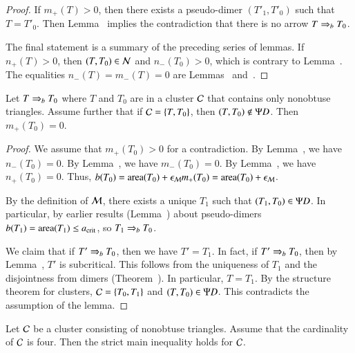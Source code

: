 \begin{proof}
  If $m_+(T)>0$, then there exists a pseudo-dimer $(T'_1,T'_0)$ such
  that $T=T'_0$.  Then Lemma~ implies the
  contradiction that there is no arrow $T\Rightarrow_{b} T_0$.

  The final statement is a summary of the preceding series of lemmas.
   If $n_+(T)>0$, then $(T,T_0)\in\mathcal N$ and $n_-(T_0)>0$, which is contrary
  to Lemma~.    The equalities $n_-(T)=m_-(T)=0$ are
  Lemmas~ and~.
\end{proof}


\begin{lemma}  
  Let $T\Rightarrow_{b} T_0$ where $T$ and $T_0$ are in a cluster $\mathcal C$ that
  contains only nonobtuse triangles.  Assume further that if
  $\mathcal C=\{T,T_0\}$, then $(T,T_0)\not\in\Psi D$.  Then $m_+(T_0)=0$.
\end{lemma}

\begin{proof}  
  We assume that $m_+(T_0)>0$ for a contradiction.  By
  Lemma~, we have $n_-(T_0)=0$.  By
  Lemma~, we have $m_-(T_0)=0$.  By
  Lemma~, we have $n_+(T_0)=0$.  Thus, $b(T_0) =
  {\operatorname{area}}(T_0) + \epsilon_{\mathcal M} m_+(T_0) = {\operatorname{area}}(T_0)+\epsilon_{\mathcal M}$.

  By the definition of $\mathcal M$, there exists a unique $T_1$ such that
  $(T_1,T_0)\in \Psi D$.  In particular, by earlier results
  (Lemma~) about pseudo-dimers
  $b(T_1)={\operatorname{area}}(T_1)\le a_\text{crit}$, so $T_1\Rightarrow_{b} T_0$.

  We claim that if $T'\Rightarrow_{b} T_0$, then we have $T'=T_1$.  In fact, if
  $T'\Rightarrow_{b} T_0$, then by Lemma~, $T'$ is subcritical.
  This follows from the uniqueness of $T_1$ and the disjointness from
  dimers (Theorem~).  In particular, $T=T_1$.  By the
  structure theorem for clusters, $\mathcal C = \{T_0,T_1\}$ and
  $(T,T_0)\in\Psi D$.  This contradicts the assumption of the lemma.
\end{proof}

\begin{lemma}
  Let $\mathcal C$ be a cluster consisting of nonobtuse triangles.  Assume
  that the cardinality of $\mathcal C$ is four.  Then the strict main
  inequality holds for $\mathcal C$.
\end{lemma}

